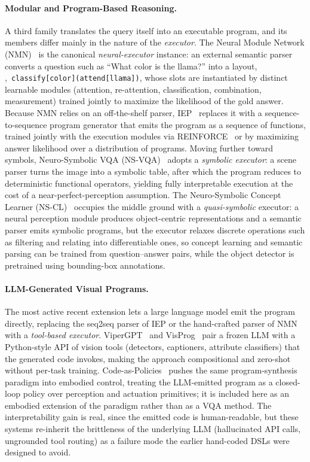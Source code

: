 \paragraph{Modular and Program-Based Reasoning.}
A third family translates the query itself into an executable program, and its members differ mainly in the nature of the \emph{executor}.
The Neural Module Network (NMN)~\cite{andreas2016neural} is the canonical \emph{neural-executor} instance: an external semantic parser converts a question such as ``What color is the llama?'' into a layout, \eg,~\texttt{classify[color](attend[llama])}, whose slots are instantiated by distinct learnable modules (attention, re-attention, classification, combination, measurement) trained jointly to maximize the likelihood of the gold answer.
Because NMN relies on an off-the-shelf parser, IEP~\cite{johnson2017inferring} replaces it with a sequence-to-sequence program generator that emits the program as a sequence of functions, trained jointly with the execution modules via REINFORCE~\cite{williams1992simple} or by maximizing answer likelihood over a distribution of programs.
Moving further toward symbols, Neuro-Symbolic VQA (NS-VQA)~\cite{yi2018neural} adopts a \emph{symbolic executor}: a scene parser turns the image into a symbolic table, after which the program reduces to deterministic functional operators, yielding fully interpretable execution at the cost of a near-perfect-perception assumption.
The Neuro-Symbolic Concept Learner (NS-CL)~\cite{mao2019neuro} occupies the middle ground with a \emph{quasi-symbolic} executor: a neural perception module produces object-centric representations and a semantic parser emits symbolic programs, but the executor relaxes discrete operations such as filtering and relating into differentiable ones, so concept learning and semantic parsing can be trained from question--answer pairs, while the object detector is pretrained using bounding-box annotations.

\paragraph{LLM-Generated Visual Programs.}
The most active recent extension lets a large language model emit the program directly, replacing the seq2seq parser of IEP or the hand-crafted parser of NMN with a \emph{tool-based executor}.
ViperGPT~\cite{suris2023vipergpt} and VisProg~\cite{gupta2023visual} pair a frozen LLM with a Python-style API of vision tools (detectors, captioners, attribute classifiers) that the generated code invokes, making the approach compositional and zero-shot without per-task training.
Code-as-Policies~\cite{liang2023code} pushes the same program-synthesis paradigm into embodied control, treating the LLM-emitted program as a closed-loop policy over perception and actuation primitives; it is included here as an embodied extension of the paradigm rather than as a VQA method.
The interpretability gain is real, since the emitted code is human-readable, but these systems re-inherit the brittleness of the underlying LLM (hallucinated API calls, ungrounded tool routing) as a failure mode the earlier hand-coded DSLs were designed to avoid.

